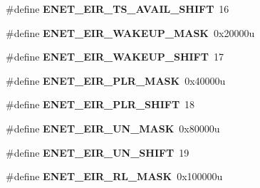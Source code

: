 \begin{DoxyCompactItemize}
\item 
\#define {\bfseries E\+N\+E\+T\+\_\+\+E\+I\+R\+\_\+\+T\+S\+\_\+\+A\+V\+A\+I\+L\+\_\+\+S\+H\+I\+FT}~16\hypertarget{group__ENET__Register__Masks_gad811839fe8168bdb1e55007a785d132b}{}\label{group__ENET__Register__Masks_gad811839fe8168bdb1e55007a785d132b}

\item 
\#define {\bfseries E\+N\+E\+T\+\_\+\+E\+I\+R\+\_\+\+W\+A\+K\+E\+U\+P\+\_\+\+M\+A\+SK}~0x20000u\hypertarget{group__ENET__Register__Masks_ga0fbd5b05a2c5421000b0a2aa1ee1565a}{}\label{group__ENET__Register__Masks_ga0fbd5b05a2c5421000b0a2aa1ee1565a}

\item 
\#define {\bfseries E\+N\+E\+T\+\_\+\+E\+I\+R\+\_\+\+W\+A\+K\+E\+U\+P\+\_\+\+S\+H\+I\+FT}~17\hypertarget{group__ENET__Register__Masks_gaca3f3ef47646913b04686a282364408d}{}\label{group__ENET__Register__Masks_gaca3f3ef47646913b04686a282364408d}

\item 
\#define {\bfseries E\+N\+E\+T\+\_\+\+E\+I\+R\+\_\+\+P\+L\+R\+\_\+\+M\+A\+SK}~0x40000u\hypertarget{group__ENET__Register__Masks_ga23e353e0ca4a78c50becad48aa46c4ec}{}\label{group__ENET__Register__Masks_ga23e353e0ca4a78c50becad48aa46c4ec}

\item 
\#define {\bfseries E\+N\+E\+T\+\_\+\+E\+I\+R\+\_\+\+P\+L\+R\+\_\+\+S\+H\+I\+FT}~18\hypertarget{group__ENET__Register__Masks_gabdf57205ac58e2b4015341f739ee1150}{}\label{group__ENET__Register__Masks_gabdf57205ac58e2b4015341f739ee1150}

\item 
\#define {\bfseries E\+N\+E\+T\+\_\+\+E\+I\+R\+\_\+\+U\+N\+\_\+\+M\+A\+SK}~0x80000u\hypertarget{group__ENET__Register__Masks_ga6bcda0d283c8681a624a9486dc5aedd3}{}\label{group__ENET__Register__Masks_ga6bcda0d283c8681a624a9486dc5aedd3}

\item 
\#define {\bfseries E\+N\+E\+T\+\_\+\+E\+I\+R\+\_\+\+U\+N\+\_\+\+S\+H\+I\+FT}~19\hypertarget{group__ENET__Register__Masks_ga0fe318423bbdaea2e6d5731654850bc1}{}\label{group__ENET__Register__Masks_ga0fe318423bbdaea2e6d5731654850bc1}

\item 
\#define {\bfseries E\+N\+E\+T\+\_\+\+E\+I\+R\+\_\+\+R\+L\+\_\+\+M\+A\+SK}~0x100000u\hypertarget{group__ENET__Register__Masks_gaadac5817effd9bee22c9669a636d9f33}{}\label{group__ENET__Register__Masks_gaadac5817effd9bee22c9669a636d9f33}


\end{DoxyCompactItemize}
